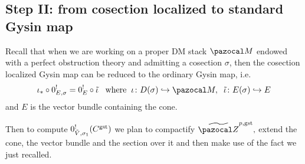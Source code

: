 \documentclass[11pt]{amsart}
\renewcommand{\to}{\rightarrow}
\newcommand{\XP}{\pazocal{X\!P}}
\newcommand{\hL}{\widehat{\mathcal L}}
\newcommand{\Z}{\pazocal Z}
\newcommand{\tZ}{\widetilde{\pazocal Z}}
\newcommand{\R}{\operatorname{R}}
\theoremstyle{plain}
\theoremstyle{definition}
\begin{document}

\subsection*{Step II: from cosection localized to standard Gysin map}
Recall that when we are working on a proper DM stack $\pazocal M$ endowed with a perfect obstruction theory and admitting a cosection $\sigma$, then the cosection localized Gysin map can be reduced to the ordinary Gysin map, i.e.
\[\iota_*\circ 0^{!}_{E,\sigma}=0_E^{!}\circ \tilde{\iota}\;\;\;\text{where}\;\;\iota\colon D(\sigma)\hookrightarrow\pazocal M,\;\;\tilde{\iota}\colon E(\sigma)\hookrightarrow E\]
and $E$ is the vector bundle containing the cone.

Then to compute $0^!_{\tilde V,\sigma_1}(C^{\rm{gst}})$ we plan to compactify $\tZ^{p,\rm{gst}},$ extend the cone, the vector bundle and the section over it and then make use of the fact we just recalled.
\end{document}
